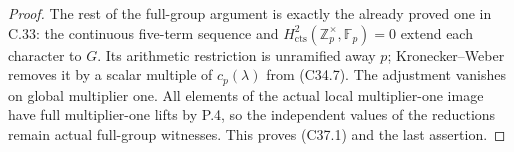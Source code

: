 \begin{proof}
The rest of the full-group argument is exactly the
already proved one in C.33: the continuous five-term
sequence and
$H^2_{\mathrm{cts}}(\mathbb Z_p^\times,\mathbb F_p)=0$
extend each character to $G$.
Its arithmetic restriction is unramified away $p$;
Kronecker--Weber removes it by a scalar multiple of
$c_p(\lambda)$ from (C34.7).
The adjustment vanishes on global multiplier one.
All elements of the actual local multiplier-one
image have full multiplier-one lifts by P.4, so
the independent values of the reductions remain
actual full-group witnesses.
This proves (C37.1) and the last assertion.
\end{proof}
